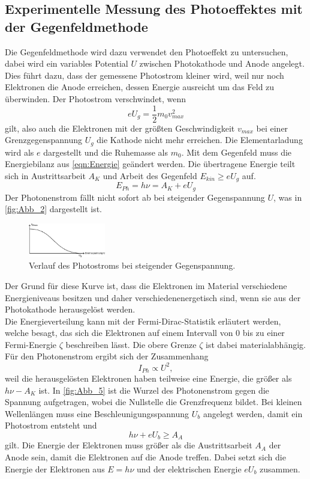 \subsection{Experimentelle Messung des Photoeffektes mit der Gegenfeldmethode}
\label{sec:Gegenfeldmethode}
Die Gegenfeldmethode wird dazu verwendet den Photoeffekt zu untersuchen, dabei wird ein variables Potential $U$
zwischen Photokathode und Anode angelegt. Dies führt dazu, dass der gemessene Photostrom kleiner wird, weil nur noch Elektronen 
die Anode erreichen, dessen Energie ausreicht um das Feld zu überwinden. Der Photostrom verschwindet, wenn
\begin{equation*}
    e U_g = \frac{1}{2} m_0 v^2_{max}
\end{equation*}
gilt, also auch die Elektronen mit der größten Geschwindigkeit $v_{max}$ bei einer Grenzgegenspannung $U_g$ die Kathode nicht mehr erreichen.
Die Elementarladung wird als $e$ dargestellt und die Ruhemasse als $m_0$. Mit dem Gegenfeld muss die Energiebilanz aus \autoref{eqn:Energie} geändert werden.
Die übertragene Energie teilt sich in Austrittsarbeit $A_K$ und Arbeit des Gegenfeld $E_{kin} \geq e U_g$ auf.
\begin{equation}
    E_{Ph} = h \nu = A_K + e U_g
\end{equation}
Der Photonenstrom fällt nicht sofort ab bei steigender Gegenspannung $U$, was in \autoref{fig:Abb_2} dargestellt ist.
\begin{figure}[H]
    \centering
    \includegraphics[width=0.3\textwidth]{build/Abb_5.pdf}
    \caption{Verlauf des Photostroms bei steigender Gegenspannung.\cite{V500}}
    \label{fig:Abb_5}
\end{figure}
Der Grund für diese Kurve ist, dass die Elektronen im Material verschiedene Energieniveaus besitzen 
und daher verschiedenenergetisch sind, wenn sie aus der Photokathode herausgelöst werden.\\
Die Energieverteilung kann mit der Fermi-Dirac-Statistik erläutert werden, welche besagt, das sich die Elektronen auf einem Intervall
von 0 bis zu einer Fermi-Energie $\zeta$ beschreiben lässt. Die obere Grenze $\zeta$ ist dabei materialabhängig.
Für den Photonenstrom ergibt sich der Zusammenhang
\begin{equation}
    I_{Ph} \propto U^2,
\end{equation}
weil die herausgelösten Elektronen haben teilweise eine Energie, die größer als $h\nu -A_K$ ist.
In \autoref{fig:Abb_5} ist die Wurzel des Photonenstrom gegen die Spannung aufgetragen, wobei die Nullstelle  die 
Grenzfrequenz bildet.
Bei kleinen Wellenlängen muss eine Beschleunigungsspannung $U_b$ angelegt werden, damit ein Photostrom entsteht und
\begin{equation*}
    h\nu + e U_b \geq A_A
\end{equation*}
gilt. Die Energie der Elektronen muss größer als die Austrittsarbeit $A_A$ der Anode sein, damit die Elektronen auf die Anode treffen.
Dabei setzt sich die Energie der Elektronen aus $E = h \nu $ und der elektrischen Energie $e U_b$ zusammen.

